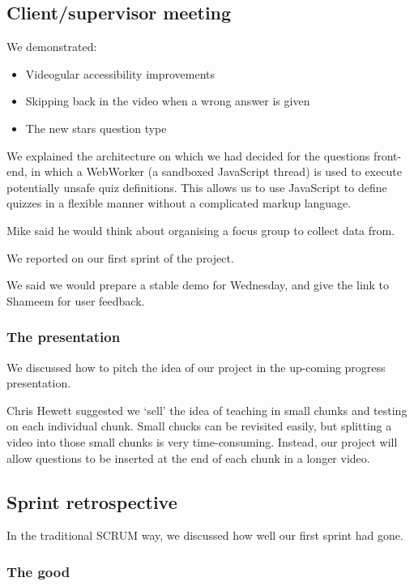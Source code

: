 \subsection{Client/supervisor meeting}

We demonstrated:

\begin{itemize}
\itemsep1pt\parskip0pt
\item
  Videogular accessibility improvements
\item
  Skipping back in the video when a wrong answer is given
\item
  The new stars question type
\end{itemize}

We explained the architecture on which we had decided for the questions
front-end, in which a WebWorker (a sandboxed JavaScript thread) is used
to execute potentially unsafe quiz definitions. This allows us to use
JavaScript to define quizzes in a flexible manner without a complicated
markup language.

Mike said he would think about organising a focus group to collect data
from.

We reported on our first sprint of the project.

We said we would prepare a stable demo for Wednesday, and give the link
to Shameem for user feedback.

\subsubsection{The presentation}

We discussed how to pitch the idea of our project in the up-coming
progress presentation.

Chris Hewett suggested we `sell' the idea of teaching in small chunks
and testing on each individual chunk. Small chucks can be revisited
easily, but splitting a video into those small chunks is very
time-consuming. Instead, our project will allow questions to be inserted
at the end of each chunk in a longer video.

\subsection{Sprint retrospective}

In the traditional SCRUM way, we discussed how well our first sprint had
gone.

\subsubsection{The good}

